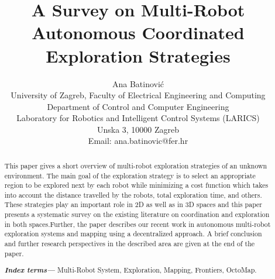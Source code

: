 \documentclass[letterpaper, 10 pt, conference]{ieeeconf}  %
\title{\LARGE \bf
	A Survey on Multi-Robot Autonomous Coordinated Exploration Strategies
}
\author{Ana Batinovi\'{c} \\
	University of Zagreb, Faculty of Electrical Engineering and Computing \\
	Department of Control and Computer Engineering\\
	Laboratory for Robotics and Intelligent Control Systems (LARICS) \\
	Unska 3, 10000 Zagreb \\
	Email: ana.batinovic@fer.hr
}
\providecommand{\indexterms}[1]{\textbf{\textit{Index terms---}} #1}
\begin{document}
\maketitle

\thispagestyle{empty}
\pagestyle{empty}


\begin{abstract}

This paper gives a short overview of multi-robot exploration strategies of an unknown environment. The main goal of the exploration strategy is to select an appropriate region to be explored next by each robot while minimizing a cost function  which takes into account the distance travelled by the robots, total exploration time, and others.
These strategies play an important role in 2D as well as in 3D spaces and this paper presents a systematic survey on the existing literature on coordination and exploration in both spaces.Further, the paper describes our recent work in autonomous multi-robot exploration systems and mapping using a decentralized approach.
A brief conclusion and further research perspectives in the described area are given at the end of the paper. 

 
\indexterms{Multi-Robot System, Exploration, Mapping, Frontiers, OctoMap.}

\end{abstract}





%









\end{document}
